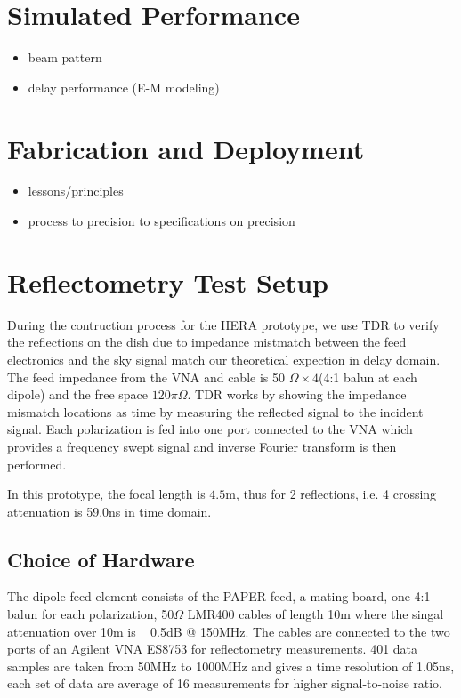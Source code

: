 \documentclass[preprint]{aastex}  %
\begin{document}
\section{Simulated Performance}
\label{sec:sim}

\begin{itemize}
\item beam pattern
\item delay performance (E-M modeling)
\end{itemize}

\section{Fabrication and Deployment}
\label{sec:deploy}

\begin{itemize}
\item lessons/principles
\item process to precision to specifications on precision
\end{itemize}





\section{Reflectometry Test Setup}
\label{sec:reflect}
During the contruction process for the HERA prototype, we use TDR to verify the reflections on the dish due to impedance mistmatch between the feed electronics and the sky signal match our theoretical expection in delay domain. The feed impedance from the VNA and cable is 50 $\Omega\times4$(4:1 balun at each dipole)  and the free space $120\pi\Omega$. TDR works by showing the impedance mismatch locations as time by measuring the reflected signal to the incident signal. Each polarization is fed into one port connected to the VNA which provides a frequency swept signal and inverse Fourier transform is then performed. 

In this prototype, the focal length is $4.5$m, thus for 2 reflections, i.e. 4 crossing attenuation is 59.0ns in time domain.

\subsection{Choice of Hardware}
The dipole feed element consists of the PAPER feed, a mating board, one 4:1 balun for each polarization, 50$\Omega$ LMR400 cables of length 10m where the singal attenuation over 10m is ~ 0.5dB @ 150MHz. 
The cables are connected to the two ports of an Agilent VNA ES8753 for reflectometry measurements. 401 data samples are taken from 50MHz to 1000MHz and gives a time resolution of 1.05ns, each set of data are average of 16 measurements for higher signal-to-noise ratio.
\end{document}

